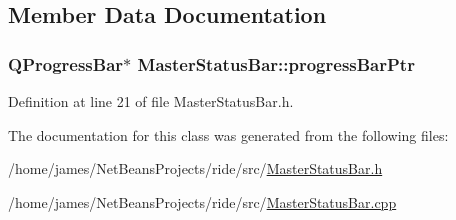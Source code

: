 \subsection{Member Data Documentation}
\hypertarget{class_master_status_bar_a4f1c75f98f848f39b92c6ebba539fdae}{
\subsubsection[{progress\-Bar\-Ptr}]{\setlength{\rightskip}{0pt plus 5cm}Q\-Progress\-Bar$\ast$ Master\-Status\-Bar\-::progress\-Bar\-Ptr\hspace{0.3cm}{\ttfamily [private]}}}\label{class_master_status_bar_a4f1c75f98f848f39b92c6ebba539fdae}


Definition at line 21 of file Master\-Status\-Bar.\-h.



The documentation for this class was generated from the following files\-:\begin{DoxyCompactItemize}
\item 
/home/james/\-Net\-Beans\-Projects/ride/src/\hyperlink{_master_status_bar_8h}{Master\-Status\-Bar.\-h}\item 
/home/james/\-Net\-Beans\-Projects/ride/src/\hyperlink{_master_status_bar_8cpp}{Master\-Status\-Bar.\-cpp}\end{DoxyCompactItemize}
